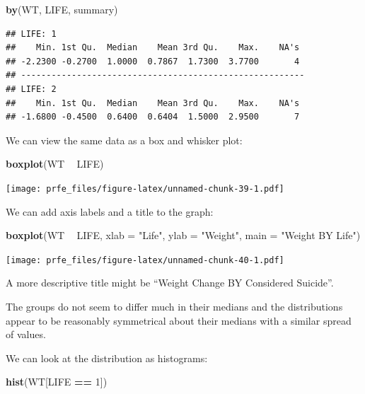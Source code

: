 \documentclass[12pt,]{book}
\newenvironment{Shaded}{\begin{snugshade}}{\end{snugshade}}
\newcommand{\KeywordTok}[1]{\textcolor[rgb]{0.13,0.29,0.53}{\textbf{#1}}}
\newcommand{\DataTypeTok}[1]{\textcolor[rgb]{0.13,0.29,0.53}{#1}}
\newcommand{\DecValTok}[1]{\textcolor[rgb]{0.00,0.00,0.81}{#1}}
\newcommand{\StringTok}[1]{\textcolor[rgb]{0.31,0.60,0.02}{#1}}
\newcommand{\OperatorTok}[1]{\textcolor[rgb]{0.81,0.36,0.00}{\textbf{#1}}}
\newcommand{\NormalTok}[1]{#1}
\theoremstyle{definition}
\theoremstyle{definition}
\theoremstyle{definition}
\theoremstyle{remark}
\begin{document}
\begin{Shaded}
\begin{Highlighting}[]
\KeywordTok{by}\NormalTok{(WT, LIFE, summary)}
\end{Highlighting}
\end{Shaded}

\begin{verbatim}
## LIFE: 1
##    Min. 1st Qu.  Median    Mean 3rd Qu.    Max.    NA's 
## -2.2300 -0.2700  1.0000  0.7867  1.7300  3.7700       4 
## -------------------------------------------------------- 
## LIFE: 2
##    Min. 1st Qu.  Median    Mean 3rd Qu.    Max.    NA's 
## -1.6800 -0.4500  0.6400  0.6404  1.5000  2.9500       7
\end{verbatim}

We can view the same data as a box and whisker plot:

\begin{Shaded}
\begin{Highlighting}[]
\KeywordTok{boxplot}\NormalTok{(WT }\OperatorTok{~}\StringTok{ }\NormalTok{LIFE)}
\end{Highlighting}
\end{Shaded}

\texttt{[image: prfe\_files/figure-latex/unnamed-chunk-39-1.pdf]}

We can add axis labels and a title to the graph:

\begin{Shaded}
\begin{Highlighting}[]
\KeywordTok{boxplot}\NormalTok{(WT }\OperatorTok{~}\StringTok{ }\NormalTok{LIFE,}
        \DataTypeTok{xlab =} \StringTok{"Life"}\NormalTok{,}
        \DataTypeTok{ylab =} \StringTok{"Weight"}\NormalTok{,}
        \DataTypeTok{main =} \StringTok{"Weight BY Life"}\NormalTok{)}
\end{Highlighting}
\end{Shaded}

\texttt{[image: prfe\_files/figure-latex/unnamed-chunk-40-1.pdf]}

A more descriptive title might be ``Weight Change BY Considered
Suicide''.

The groups do not seem to differ much in their medians and the
distributions appear to be reasonably symmetrical about their medians
with a similar spread of values.

We can look at the distribution as histograms:

\begin{Shaded}
\begin{Highlighting}[]
\KeywordTok{hist}\NormalTok{(WT[LIFE }\OperatorTok{==}\StringTok{ }\DecValTok{1}\NormalTok{])}
\end{Highlighting}
\end{Shaded}
\end{document}
